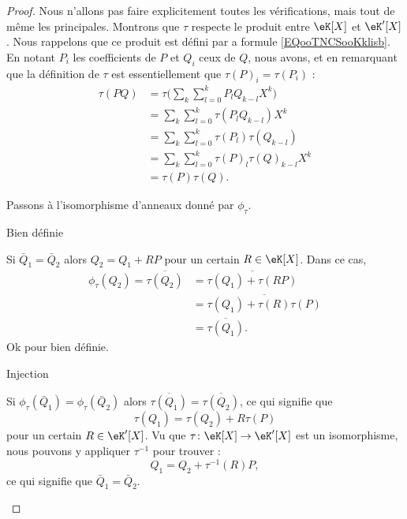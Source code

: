 \begin{proof}
    Nous n'allons pas faire explicitement toutes les vérifications, mais tout de même les principales. Montrons que \( \tau\) respecte le produit entre \( \eK[X]\) et \( \eK'[X]\). Nous rappelons que ce produit est défini par a formule \eqref{EQooTNCSooKklisb}. En notant \( P_i\) les coefficients de \( P\) et \( Q_i\) ceux de \( Q\), nous avons, et en remarquant que la définition de \( \tau\) est essentiellement que \( \tau(P)_i=\tau(P_i)\) :
    \begin{subequations}
        \begin{align}
            \tau(PQ)&=\tau\big( \sum_k\sum_{l=0}^kP_lQ_{k-l}X^k \big)\\
            &=\sum_k\sum_{l=0}^k\tau(P_lQ_{k-l})X^k\\
            &=\sum_k\sum_{l=0}^k\tau(P_l)\tau(Q_{k-l})\\
            &=\sum_k\sum_{l=0}^k\tau(P)_l\tau(Q)_{k-l}X^k\\
            &=\tau(P)\tau(Q).
        \end{align}
    \end{subequations}
    
    Passons à l'isomorphisme d'anneaux donné par \( \phi_{\tau}\).
    \begin{subproof}
        \item[Bien définie]
        
            Si \( \bar Q_1=\bar Q_2\) alors \( Q_2=Q_1+RP\) pour un certain \( R\in \eK[X]\). Dans ce cas,
            \begin{subequations}
                \begin{align}
                    \phi_{\tau}(Q_2)=\overline{ \tau(Q_2) }&=\overline{ \tau(Q_1)+\tau(RP) }\\
                    &=\overline{ \tau(Q_1)+\tau(R)\tau(P) }\\
                    &=\overline{ \tau(Q_1) }.
                \end{align}
            \end{subequations}
            Ok  pour bien définie.

        \item[Injection]

            Si \( \phi_{\tau}(\bar Q_1)=\phi_{\tau}(\bar Q_2)\) alors \( \overline{ \tau(Q_1) }=\overline{ \tau(Q_2) }\), ce qui signifie que
            \begin{equation}
                \tau(Q_1)=\tau(Q_2)+R\tau(P)
            \end{equation}
            pour un certain \( R\in \eK'[X]\). Vu que \( \tau\colon \eK[X]\to \eK'[X]\) est un isomorphisme, nous pouvons y appliquer \( \tau^{-1}\) pour trouver :
            \begin{equation}
                Q_1=Q_2+\tau^{-1}(R)P,
            \end{equation}
            ce qui signifie que \( \bar Q_1=\bar Q_2\).


\end{subproof}
\end{proof}
